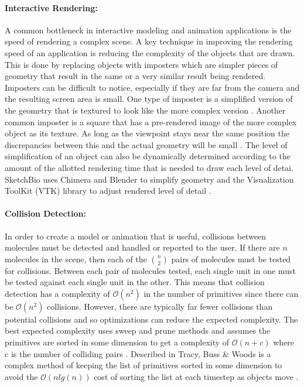 \documentclass[twocolumn]{bmcart}%
\begin{document}
\paragraph*{Interactive Rendering:}
A common bottleneck in interactive modeling and animation applications is the speed of rendering a complex scene.  A key technique in improving the rendering speed of an application is reducing the complexity of the objects that are drawn.  This is done by replacing objects with imposters which are simpler pieces of geometry that result in the same or a very similar result being rendered.  Imposters can be difficult to notice, especially if they are far from the camera and the resulting screen area is small.  One type of imposter is a simplified version of the geometry that is textured to look like the more complex version \cite{decoret2003billboard}\cite{erikson1998simplification}\cite{cohen1998appearance}.  Another common imposter is a square that has a pre-rendered image of the more complex object as its texture.  As long as the viewpoint stays near the same position the discrepancies between this and the actual geometry will be small \cite{aliaga1996visualization}\cite{maciel1995visual}.  The level of simplification of an object can also be dynamically determined according to the amount of the allotted rendering time that is needed to draw each level of detai.  SketchBio uses Chimera and Blender to simplify geometry and the Visualization ToolKit (VTK) library to adjust rendered level of detail \cite{VTKbook}.

\paragraph*{Collision Detection:}
In order to create a model or animation that is useful, collisions between molecules must be detected and handled or reported to the user.  If there are $n$ molecules in the scene, then each of the $n\choose 2$ pairs of molecules must be tested for collisions.  Between each pair of molecules tested, each single unit in one must be tested against each single unit in the other.  This means that collision detection has a complexity of $\mathcal{O}(n^2)$ in the number of primitives since there can be $\mathcal{O}(n^2)$ collisions.  However, there are typically far fewer collisions than potential collisions and so optimizations can reduce the expected complexity.  The best expected complexity uses sweep and prune methods and assumes the primitives are sorted in some dimension to get a complexity of $\mathcal{O}(n + c)$ where c is the number of colliding pairs \cite{tracy2009efficient}.  Described in Tracy, Buss \& Woods is a complex method of keeping the list of primitives sorted in some dimension to avoid the $\mathcal{O}(n lg(n))$ cost of sorting the list at each timestep as objects move \cite{tracy2009efficient}.
\end{document}
